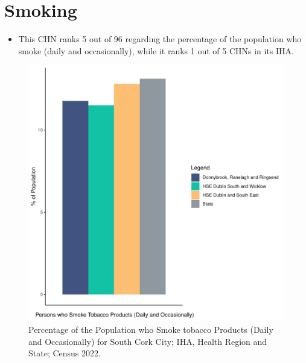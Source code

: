 \documentclass{article}
\begin{document}
\pagebreak

\section{Smoking}\label{sect:Smoking}
\begin{itemize}
\item This CHN ranks  5 out of 96 regarding the percentage of the population who smoke (daily and occasionally), while it ranks   1 out of 5 CHNs in its IHA.
\end{itemize}
\begin{figure}[H]
	\centering
	\includegraphics[width = 120mm]{../figures/SmokingED.pdf}
	\caption{Percentage of the Population who Smoke tobacco Products (Daily and Occasionally) for South Cork City; IHA, Health Region and State; Census 2022.}
	\label{fig:2ae19629-1a6a-13a3-e055-000000000001}
	\end{figure}
	
\end{document}
